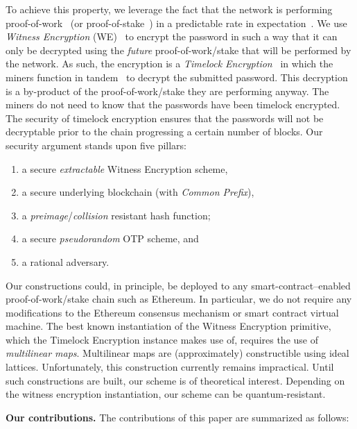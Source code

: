 To achieve this property, we leverage the fact that the network is performing
proof-of-work~\cite{pow} (or proof-of-stake~\cite{ouroboros}) in a predictable rate in expectation~\cite{bitcoin-sok}. We use \emph{Witness Encryption}
(WE)~\cite{STOC:GGSW13} to encrypt
the password in such a way that it can only be decrypted using the \emph{future}
proof-of-work/stake that will be performed by the network. As such, the encryption
is a \emph{Timelock Encryption}~\cite{timelock} in which the miners function in tandem~\cite{timelock-bitcoin} to
decrypt the submitted password. This decryption is a by-product of
the proof-of-work/stake they are performing anyway. The miners do not need to know that the
passwords have been timelock encrypted. The security of timelock encryption
ensures that the passwords will not be decryptable prior to the chain progressing
a certain number of blocks. Our security argument stands upon five pillars:

\begin{enumerate}
      \item a secure \emph{extractable} Witness Encryption scheme,
      \item a secure underlying blockchain (with \emph{Common Prefix}),
      \item a \emph{preimage}/\emph{collision} resistant hash function;
      \item a secure \emph{pseudorandom} OTP scheme, and
      \item a rational adversary.
\end{enumerate}

Our constructions could, in principle, be deployed to any smart-contract--enabled
proof-of-work/stake chain such as Ethereum. In particular, we do not require any modifications
to the Ethereum consensus mechanism or smart contract virtual machine. The
best known instantiation of the Witness Encryption primitive, which the Timelock Encryption
instance makes use of, requires the use of \emph{multilinear maps}.
Multilinear maps are (approximately) constructible using ideal lattices.
Unfortunately, this construction currently remains impractical.
Until such constructions are built, our scheme is of theoretical interest.
Depending on the witness encryption instantiation, our scheme can be quantum-resistant.

\noindent
\textbf{Our contributions.}
The contributions of this paper are summarized as follows:

